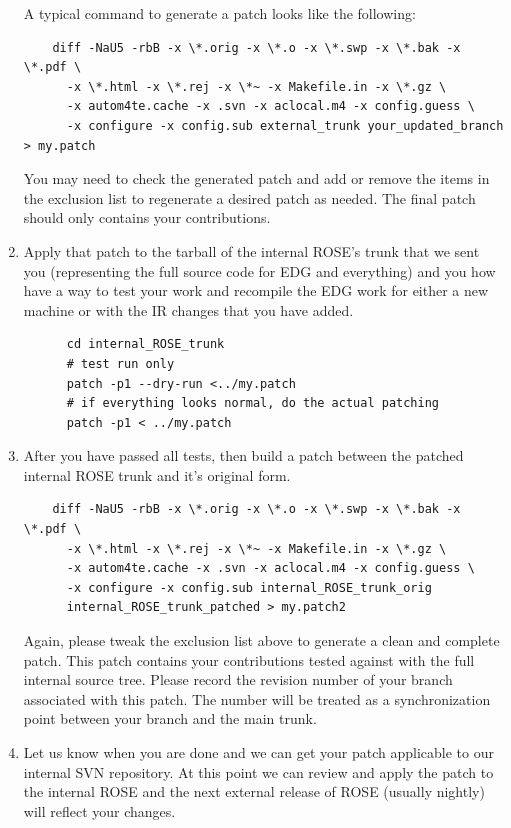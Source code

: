 \begin{enumerate}
   A typical  command to generate a patch looks like the following:
    \begin{verbatim}
    diff -NaU5 -rbB -x \*.orig -x \*.o -x \*.swp -x \*.bak -x \*.pdf \
      -x \*.html -x \*.rej -x \*~ -x Makefile.in -x \*.gz \
      -x autom4te.cache -x .svn -x aclocal.m4 -x config.guess \
      -x configure -x config.sub external_trunk your_updated_branch > my.patch
    \end{verbatim}
    You may need to check the generated patch and add or remove the items
    in the exclusion list to regenerate a desired patch as needed.
    The final patch should only contains your contributions.
   \item Apply that patch to the tarball of the internal ROSE's trunk that we sent you (representing
     the full source code for EDG and everything) and you how have a way to test
     your work and recompile the EDG work for either a new machine or with the IR changes
     that you have added.
     \begin{verbatim}
      cd internal_ROSE_trunk
      # test run only
      patch -p1 --dry-run <../my.patch
      # if everything looks normal, do the actual patching
      patch -p1 < ../my.patch
     \end{verbatim}
   \item After you have passed all tests, then build a patch between the
   patched internal ROSE trunk and it's original form. 
    \begin{verbatim}
    diff -NaU5 -rbB -x \*.orig -x \*.o -x \*.swp -x \*.bak -x \*.pdf \
      -x \*.html -x \*.rej -x \*~ -x Makefile.in -x \*.gz \
      -x autom4te.cache -x .svn -x aclocal.m4 -x config.guess \
      -x configure -x config.sub internal_ROSE_trunk_orig
      internal_ROSE_trunk_patched > my.patch2
    \end{verbatim}
    Again, please tweak the exclusion list above to generate a clean and
    complete patch. This patch contains your contributions tested against
    with the full internal source tree. Please record the revision number
    of your branch associated with this patch. The number will be treated
    as a synchronization point between your branch and the main trunk. 
   \item Let us know when you are done and we can get your patch applicable to
   our internal SVN repository. At this point we can review and apply the
   patch to the internal ROSE and
    the next external release of ROSE (usually nightly) will reflect your changes.
\end{enumerate}

